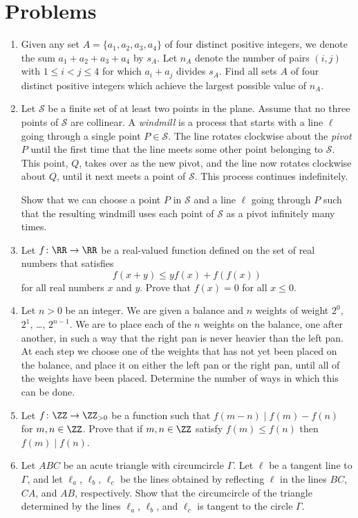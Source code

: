 \documentclass[11pt]{scrartcl}
\begin{document}
\section{Problems}
\begin{enumerate}[\bfseries 1.]
\item %
Given any set $A = \{a_1, a_2, a_3, a_4\}$ of four distinct
positive integers, we denote the sum $a_1+a_2+a_3+a_4$ by $s_A$.
Let $n_A$ denote the number of pairs $(i,j)$ with $1 \le i < j \le 4$
for which $a_i + a_j$ divides $s_A$.
Find all sets $A$ of four distinct positive integers which achieve
the largest possible value of $n_A$.

\item %
Let $\mathcal{S}$ be a finite set of at least two points in the plane.
Assume that no three points of $\mathcal S$ are collinear.
A \emph{windmill} is a process that starts with a
line $\ell$ going through a single point $P \in \mathcal S$.
The line rotates clockwise about the \emph{pivot} $P$ until the first time
that the line meets some other point belonging to $\mathcal S$.
This point, $Q$, takes over as the new pivot,
and the line now rotates clockwise about $Q$,
until it next meets a point of $\mathcal S$.
This process continues indefinitely.

Show that we can choose a point $P$ in $\mathcal S$ and
a line $\ell$ going through $P$ such that the resulting windmill
uses each point of $\mathcal S$ as a pivot infinitely many times.

\item %
Let $f \colon \RR \to \RR$ be a real-valued function
defined on the set of real numbers that satisfies
\[ f(x+y) \leq yf(x) + f(f(x))\]
for all real numbers $x$ and $y$.
Prove that $f(x) = 0$ for all $x \leq 0$.

\item %
Let $n > 0$ be an integer.
We are given a balance and $n$ weights of weight $2^0$, $2^1$, \dots, $2^{n-1}$.
We are to place each of the $n$ weights on the balance, one after another,
in such a way that the right pan is never heavier than the left pan.
At each step we choose one of the weights
that has not yet been placed on the balance,
and place it on either the left pan or the right pan,
until all of the weights have been placed.
Determine the number of ways in which this can be done.

\item %
Let $f \colon \ZZ \to \ZZ_{>0}$ be a function such that
$f(m-n) \mid f(m) - f(n)$ for $m,n \in \ZZ$.
Prove that if $m,n \in \ZZ$ satisfy $f(m) \le f(n)$
then $f(m) \mid f(n)$.

\item %
Let $ABC$ be an acute triangle with circumcircle $\Gamma$.
Let $\ell$ be a tangent line to $\Gamma$, and let $\ell_a$, $\ell_b$, $\ell_c$ be the lines obtained
by reflecting $\ell$ in the lines $BC$, $CA$, and $AB$, respectively.
Show that the circumcircle of the triangle determined by the lines $\ell_a$, $\ell_b$, and $\ell_c$
is tangent to the circle $\Gamma$.

\end{enumerate}
\pagebreak
\end{document}
